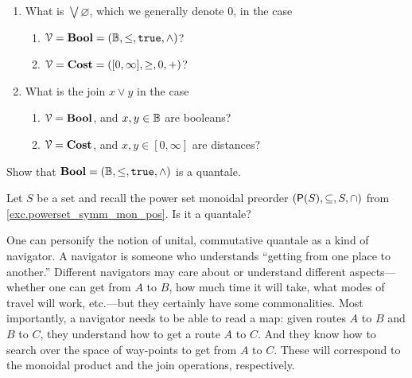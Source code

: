 \documentclass[7Sketches]{subfiles}
\begin{document}
\begin{exercise}%
\label{exc.matrix_mult1}
\begin{enumerate}
	\item What is $\bigvee\varnothing$, which we generally denote $0$, in the case 
  \begin{enumerate}[label=\alph*.]
  	\item $\mathcal{V}=\mathbf{Bool}=(\mathbb{B},\leq,\mathtt{true},\wedge)$?
  	\item $\mathcal{V}=\mathbf{Cost}=([0,\infty],\geq,0,+)$?
  \end{enumerate}
  \item What is the join $x\vee y$ in the case
  \begin{enumerate}[label=\alph*.]
  	\item $\mathcal{V}=\mathbf{Bool}$, and $x,y\in\mathbb{B}$ are booleans?
  	\item $\mathcal{V}=\mathbf{Cost}$, and $x,y\in[0,\infty]$ are distances?
	  \qedhere
  \end{enumerate}  
\qedhere
\end{enumerate}
\end{exercise}


\begin{exercise}%
\label{exc.Bool_quantale}%
Show that $\mathbf{Bool}=(\mathbb{B},\leq,\mathtt{true},\wedge)$ is a quantale.
\end{exercise}

\begin{exercise} %
\label{exc.powerset_quantale}
Let $S$ be a set and recall the power set monoidal preorder $(\mathsf{P}(S),\subseteq,S,\cap)$ from \cref{exc.powerset_symm_mon_pos}. Is it a quantale?
\end{exercise}

\begin{remark}%
\label{rem.personify_navigator}%
One can personify the notion of unital, commutative quantale as a kind of
navigator. A navigator is someone who understands ``getting from one place to
another.'' Different navigators may care about or understand different
aspects---whether one can get from $A$ to $B$, how much time it will take, what
modes of travel will work, etc.---but they certainly have some commonalities.
Most importantly, a navigator needs to be able to read a map: given routes $A$
to $B$ and $B$ to $C$, they understand how to get a route $A$ to $C$. And they
know how to search over the space of way-points to get from $A$ to $C$. These
will correspond to the monoidal product and the join operations, respectively.
\end{remark}
\end{document}
